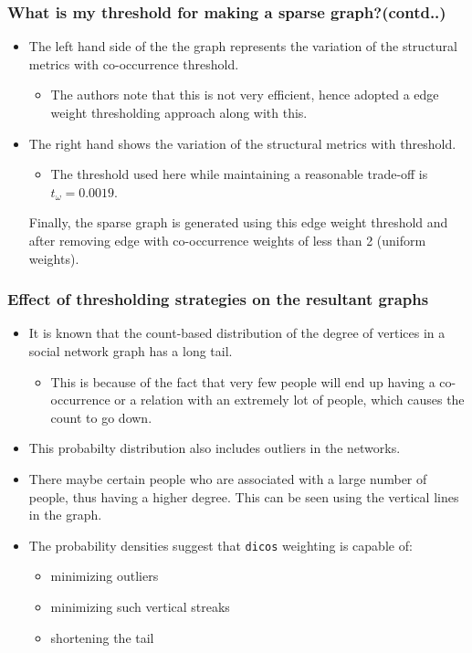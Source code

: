 \documentclass[10pt, compress]{beamer}
\begin{document}
\begin{frame}[fragile]
	\frametitle{What is my threshold for making a sparse graph?{\small (contd..)}}
\begin{itemize}
\item The left hand side of the the graph represents the variation of the structural metrics with co-occurrence threshold.
\begin{itemize}
	\item The authors note that this is not very efficient, hence adopted a edge weight thresholding approach along with this.
\end{itemize}
\item The right hand shows the variation of the structural metrics with threshold.
\begin{itemize}
	\item The threshold used here while maintaining a reasonable trade-off is \(t_{\omega} = 0.0019\).
\end{itemize}
Finally, the sparse graph is generated using this edge weight threshold and after removing edge with co-occurrence weights of less than 2 (uniform weights).
\end{itemize}
\end{frame}

\begin{frame}[fragile]
	\frametitle{\normalsize Effect of thresholding strategies on the resultant graphs}
\vspace{-5mm}
\begin{itemize}
\item It is known that the count-based distribution of the degree of vertices in a social network graph has a long tail.
\begin{itemize}
	\item This is because of the fact that very few people will end up having a co-occurrence or a relation with an extremely lot of people, which causes the count to go down.
\end{itemize}
\item This probabilty distribution also includes outliers in the networks.
\item There maybe certain people who are associated with a large number of people, thus having a higher degree. This can be seen using the vertical lines in the graph.
\item The probability densities suggest that \texttt{dicos} weighting is capable of:
\begin{itemize}
	\item minimizing outliers
    \item minimizing such vertical streaks
    \item shortening the tail
\end{itemize}
\end{itemize}
\end{frame}
\end{document}

